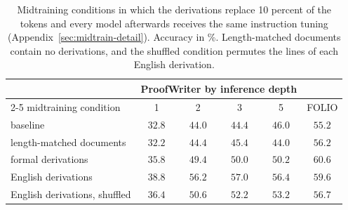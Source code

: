 \begin{table}[H]
\caption{Midtraining conditions in which the derivations replace 10 percent of the tokens and every model afterwards receives the same instruction tuning (Appendix~\ref{sec:midtrain-detail}). Accuracy in \%. Length-matched documents contain no derivations, and the shuffled condition permutes the lines of each English derivation.}
\label{tab:shuffle}
\begin{center}
\small
\begin{tabular}{lccccc}
\toprule
 & \multicolumn{4}{c}{ProofWriter by inference depth} & \\
\cmidrule(lr){2-5}
midtraining condition & 1 & 2 & 3 & 5 & FOLIO \\
\midrule
baseline                       & $32.8$ & $44.0$ & $44.4$ & $46.0$ & $55.2$ \\
length-matched documents      & $32.2$ & $44.4$ & $45.4$ & $44.0$ & $56.2$ \\
formal derivations            & $35.8$ & $49.4$ & $50.0$ & $50.2$ & $\mathbf{60.6}$ \\
English derivations           & $\mathbf{38.8}$ & $\mathbf{56.2}$ & $\mathbf{57.0}$ & $\mathbf{56.4}$ & $59.6$ \\
English derivations, shuffled & $36.4$ & $50.6$ & $52.2$ & $53.2$ & $56.7$ \\
\bottomrule
\end{tabular}
\end{center}
\end{table}
